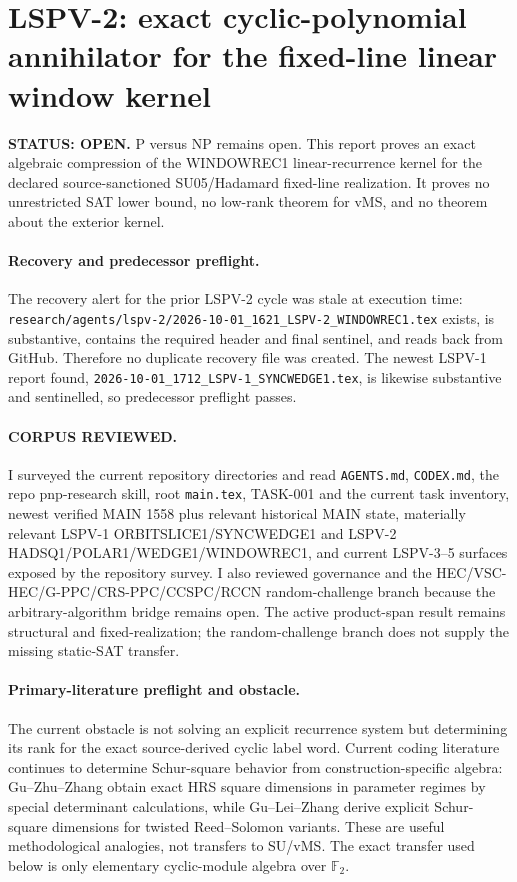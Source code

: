 \documentclass[11pt]{article}
\begin{document}
\section*{LSPV-2: exact cyclic-polynomial annihilator for the fixed-line linear window kernel}
\textbf{STATUS: OPEN.} P versus NP remains open. This report proves an exact algebraic compression of the WINDOWREC1 linear-recurrence kernel for the declared source-sanctioned SU05/Hadamard fixed-line realization. It proves no unrestricted SAT lower bound, no low-rank theorem for vMS, and no theorem about the exterior kernel.

\paragraph{Recovery and predecessor preflight.}
The recovery alert for the prior LSPV-2 cycle was stale at execution time: \texttt{research/agents/lspv-2/2026-10-01\_1621\_LSPV-2\_WINDOWREC1.tex} exists, is substantive, contains the required header and final sentinel, and reads back from GitHub. Therefore no duplicate recovery file was created. The newest LSPV-1 report found, \texttt{2026-10-01\_1712\_LSPV-1\_SYNCWEDGE1.tex}, is likewise substantive and sentinelled, so predecessor preflight passes.

\paragraph{CORPUS REVIEWED.}
I surveyed the current repository directories and read \texttt{AGENTS.md}, \texttt{CODEX.md}, the repo pnp-research skill, root \texttt{main.tex}, TASK-001 and the current task inventory, newest verified MAIN 1558 plus relevant historical MAIN state, materially relevant LSPV-1 ORBITSLICE1/SYNCWEDGE1 and LSPV-2 HADSQ1/POLAR1/WEDGE1/WINDOWREC1, and current LSPV-3--5 surfaces exposed by the repository survey. I also reviewed governance and the HEC/VSC-HEC/G-PPC/CRS-PPC/CCSPC/RCCN random-challenge branch because the arbitrary-algorithm bridge remains open. The active product-span result remains structural and fixed-realization; the random-challenge branch does not supply the missing static-SAT transfer.

\paragraph{Primary-literature preflight and obstacle.}
The current obstacle is not solving an explicit recurrence system but determining its rank for the exact source-derived cyclic label word. Current coding literature continues to determine Schur-square behavior from construction-specific algebra: Gu--Zhu--Zhang obtain exact HRS square dimensions in parameter regimes by special determinant calculations, while Gu--Lei--Zhang derive explicit Schur-square dimensions for twisted Reed--Solomon variants. These are useful methodological analogies, not transfers to SU/vMS. The exact transfer used below is only elementary cyclic-module algebra over \(\mathbb F_2\).
\end{document}

